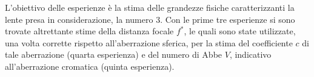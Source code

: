 L'obiettivo delle esperienze \`e la stima delle grandezze fisiche caratterizzanti la lente presa in considerazione, la numero 3. Con le prime tre esperienze si sono trovate altrettante stime della distanza focale $f^{*}$, le quali sono state utilizzate, una volta corrette rispetto all'aberrazione sferica, per la stima del coefficiente $c$ di tale aberrazione (quarta esperienza) e del numero di Abbe $V$, indicativo all'aberrazione cromatica (quinta esperienza).
